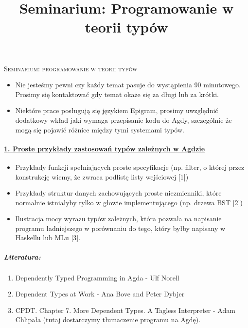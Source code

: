 \documentclass[10pt, a4paper]{article}
\author{}
\title{Seminarium: Programowanie w teorii typów}
\begin{document}
\begin{center}
\begin{Large}
\textsc{Seminarium: programowanie w teorii typów}
\end{Large}
\end{center}

\begin{itemize}
\addtolength{\itemsep}{-0.5\baselineskip}
 \item Nie jesteśmy pewni czy każdy temat pasuje do wystąpienia 90 minutowego. Prosimy się kontaktować gdy temat
       okaże się za długi lub za krótki.
 \item Niektóre prace posługują się językiem Epigram, prosimy uwzględnić dodatkowy wkład jaki wymaga przepisanie
       kodu do Agdy, szczególnie że mogą się pojawić różnice między tymi systemami typów.
       
\end{itemize}


\paragraph{\underline{1. Proste przykłady zastosowań typów zależnych w Agdzie}}

\begin{itemize}
\addtolength{\itemsep}{-0.5\baselineskip}
\item
    Przykłady funkcji spełniających proste specyfikacje (np. filter, o której przez konstrukcję wiemy, że zwraca podlistę listy wejściowej [1])
\item
    Przykłady struktur danych zachowujących proste niezmienniki, które normalnie istniałyby tylko w głowie implementującego (np. drzewa BST [2])
\item
    Ilustracja mocy wyrazu typów zależnych, która pozwala na napisanie programu ładniejszego w porównaniu do tego, który byłby napisany w Haskellu lub MLu [3].

\end{itemize}

\subparagraph{Literatura:}

\begin{enumerate}
\addtolength{\itemsep}{-0.5\baselineskip}
 \item  Dependently Typed Programming in Agda - Ulf Norell
 \item  Dependent Types at Work - Ana Bove and Peter Dybjer
 \item  CPDT. Chapter 7. More Dependent Types. A Tagless Interpreter - Adam Chlipała (tutaj dostarczymy tłumaczenie programu na Agdę).
\end{enumerate}
\end{document}
